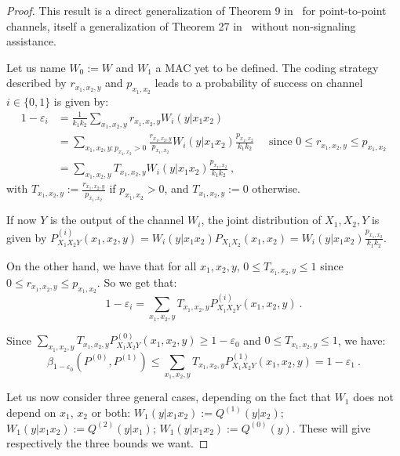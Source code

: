   \begin{proof}
    This result is a direct generalization of Theorem 9 in~\cite{Matthews12} for point-to-point channels, itself a generalization of Theorem 27 in~\cite{PPV10} without non-signaling assistance.

    Let us name $W_0:=W$ and $W_1$ a MAC yet to be defined. The coding strategy described by $r_{x_1,x_2,y}$ and $p_{x_1, x_2}$ leads to a probability of success on channel $i \in \{0,1\}$ is given by:
  \begin{equation}
    \begin{aligned}
      1 - \varepsilon_i &= \frac{1}{k_1k_2}\sum_{x_1,x_2,y} r_{x_1,x_2,y}W_i(y|x_1x_2)\\
      &= \sum_{x_1,x_2,y:p_{x_1,x_2} > 0} \frac{r_{x_1,x_2,y}}{p_{x_1,x_2}}W_i(y|x_1x_2)\frac{p_{x_1,x_2}}{k_1k_2} \quad \text{ since } 0 \leq r_{x_1,x_2,y} \leq p_{x_1,x_2}\\
      &= \sum_{x_1,x_2,y} T_{x_1,x_2,y}W_i(y|x_1x_2)\frac{p_{x_1,x_2}}{k_1k_2} \ ,
    \end{aligned}
  \end{equation}
  with $T_{x_1,x_2,y} := \frac{r_{x_1,x_2,y}}{p_{x_1,x_2}}$ if $p_{x_1,x_2} > 0$, and $T_{x_1,x_2,y} :=0$ otherwise.

  If now $Y$ is the output of the channel $W_i$, the joint distribution of $X_1,X_2,Y$ is given by $P^{(i)}_{X_1X_2Y}(x_1,x_2,y) = W_i(y|x_1x_2)P_{X_1X_2}(x_1,x_2)= W_i(y|x_1x_2)\frac{p_{x_1,x_2}}{k_1k_2}$.

  On the other hand, we have that for all $x_1,x_2,y$, $0 \leq T_{x_1,x_2,y} \leq 1$ since $0 \leq r_{x_1,x_2,y} \leq p_{x_1,x_2}$. So we get that:
  \[ 1 - \varepsilon_i = \sum_{x_1,x_2,y} T_{x_1,x_2,y}P^{(i)}_{X_1X_2Y}(x_1,x_2,y) \ . \]

  Since $\sum_{x_1,x_2,y} T_{x_1,x_2,y}P^{(0)}_{X_1X_2Y}(x_1,x_2,y) \geq 1 - \varepsilon_0$ and $0 \leq T_{x_1,x_2,y} \leq 1$, we have:
  \[ \beta_{1-\varepsilon_0}(P^{(0)},P^{(1)}) \leq \sum_{x_1,x_2,y} T_{x_1,x_2,y}P^{(1)}_{X_1X_2Y}(x_1,x_2,y) = 1 - \varepsilon_1 \ . \]

  Let us now consider three general cases, depending on the fact that $W_1$ does not depend on $x_1$, $x_2$ or both: $W_1(y|x_1x_2) := Q^{(1)}(y|x_2)$; $W_1(y|x_1x_2) := Q^{(2)}(y|x_1)$;  $W_1(y|x_1x_2) := Q^{(0)}(y)$. These will give respectively the three bounds we want.
 

\end{proof}
